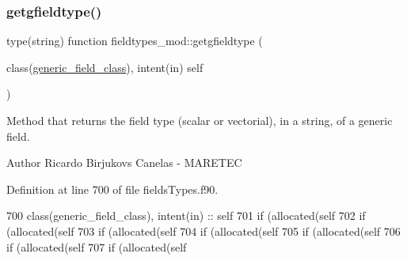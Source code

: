 \subsubsection{\texorpdfstring{getgfieldtype()}{getgfieldtype()}}
{\footnotesize\ttfamily type(string) function fieldtypes\+\_\+mod\+::getgfieldtype (\begin{DoxyParamCaption}\item[{class(\mbox{\hyperlink{structfieldtypes__mod_1_1generic__field__class}{generic\+\_\+field\+\_\+class}}), intent(in)}]{self }\end{DoxyParamCaption})\hspace{0.3cm}{\ttfamily [private]}}



Method that returns the field type (scalar or vectorial), in a string, of a generic field. 

\begin{DoxyAuthor}{Author}
Ricardo Birjukovs Canelas -\/ M\+A\+R\+E\+T\+EC 
\end{DoxyAuthor}


Definition at line 700 of file fields\+Types.\+f90.


\begin{DoxyCode}
700     \textcolor{keywordtype}{class}(generic\_field\_class), \textcolor{keywordtype}{intent(in)} :: self
701     \textcolor{keywordflow}{if} (\textcolor{keyword}{allocated}(self%
702     \textcolor{keywordflow}{if} (\textcolor{keyword}{allocated}(self%
703     \textcolor{keywordflow}{if} (\textcolor{keyword}{allocated}(self%
704     \textcolor{keywordflow}{if} (\textcolor{keyword}{allocated}(self%
705     \textcolor{keywordflow}{if} (\textcolor{keyword}{allocated}(self%
706     \textcolor{keywordflow}{if} (\textcolor{keyword}{allocated}(self%
707     \textcolor{keywordflow}{if} (\textcolor{keyword}{allocated}(self%
\end{DoxyCode}
\mbox{\label{namespacefieldtypes__mod_a3f1571ad15733a3f2fff43e35f309416}} 
